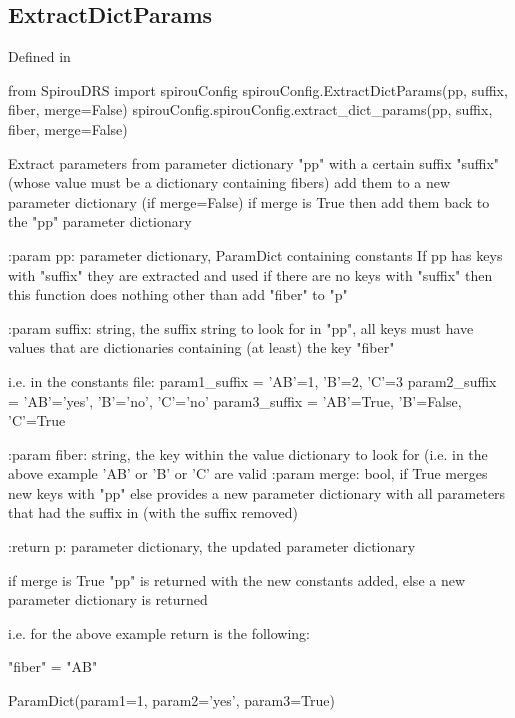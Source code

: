 \noindent\begin{minipage}{\textwidth}
\subsection{ExtractDictParams}

Defined in \spirouConfig{}

\begin{pythonbox}
from SpirouDRS import spirouConfig
spirouConfig.ExtractDictParams(pp, suffix, fiber, merge=False)
spirouConfig.spirouConfig.extract_dict_params(pp, suffix, fiber, merge=False)
\end{pythonbox}

\begin{pythondocstring}
Extract parameters from parameter dictionary "pp" with a certain suffix
"suffix" (whose value must be a dictionary containing fibers) add them
to a new parameter dictionary (if merge=False) if merge is True then
add them back to the "pp" parameter dictionary

:param pp: parameter dictionary, ParamDict containing constants
            If pp has keys with "suffix" they are extracted and used
            if there are no keys with "suffix" then this function does
            nothing other than add "fiber" to "p"

:param suffix: string, the suffix string to look for in "pp", all keys
               must have values that are dictionaries containing (at least)
               the key "fiber"

               i.e. in the constants file:
               param1_suffix = {'AB'=1, 'B'=2, 'C'=3}
               param2_suffix = {'AB'='yes', 'B'='no', 'C'='no'}
               param3_suffix = {'AB'=True, 'B'=False, 'C'=True}

:param fiber: string, the key within the value dictionary to look for
              (i.e. in the above example 'AB' or 'B' or 'C' are valid
:param merge: bool, if True merges new keys with "pp" else provides
              a new parameter dictionary with all parameters that had the
              suffix in (with the suffix removed)

:return p: parameter dictionary, the updated parameter dictionary

           if merge is True "pp" is returned with the new constants
           added, else a new parameter dictionary is returned

            i.e. for the above example return is the following:

                "fiber" = "AB"

           ParamDict(param1=1, param2='yes', param3=True)
\end{pythondocstring}
\end{minipage}

